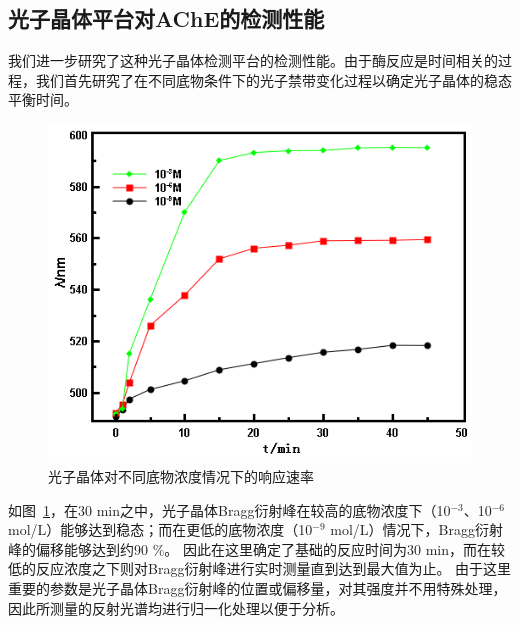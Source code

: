 \subsection{光子晶体平台对AChE的检测性能}
我们进一步研究了这种光子晶体检测平台的检测性能。由于酶反应是时间相关的过程，我们首先研究了在不同底物条件下的光子禁带变化过程以确定光子晶体的稳态平衡时间。
\begin{figure}[htbp]
  \centering
  \includegraphics[width=0.6\linewidth]{figures/ch3/saturation_curve.png}
  \caption{光子晶体对不同底物浓度情况下的响应速率}
  \label{fig:maleimide-saturation}
\end{figure}

如图~\ref{fig:maleimide-saturation}，在30 min之中，光子晶体Bragg衍射峰在较高的底物浓度下（10$^{-3}$、10$^{-6}$ mol/L）能够达到稳态；而在更低的底物浓度（10$^{-9}$ mol/L）情况下，Bragg衍射峰的偏移能够达到约90 \%。
因此在这里确定了基础的反应时间为30 min，而在较低的反应浓度之下则对Bragg衍射峰进行实时测量直到达到最大值为止。
由于这里重要的参数是光子晶体Bragg衍射峰的位置或偏移量，对其强度并不用特殊处理，因此所测量的反射光谱均进行归一化处理以便于分析。

